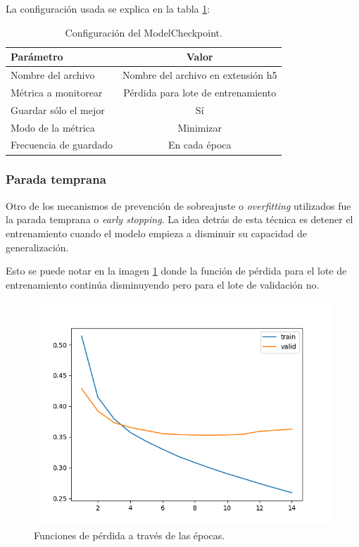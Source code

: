 La configuración usada se explica en la tabla \ref{tab:checkpoint}:
\begin{table}[H]
	\centering
	\caption[Configuración ModelCheckpoint]{Configuración del ModelCheckpoint.}
	\begin{tabular}{l c}    
		\toprule
		\textbf{Parámetro}			& 			\textbf{Valor}  \\
		\midrule	
		Nombre del archivo			& 			Nombre del archivo en extensión h5  \\
		Métrica a monitorear 		& 			Pérdida para lote de entrenamiento  \\
		Guardar sólo el mejor		&			Sí \\
		Modo de la métrica 			& 			Minimizar \\
		Frecuencia de guardado 		& 			En cada época  \\
		\bottomrule
		\hline
	\end{tabular}
	\label{tab:checkpoint}
\end{table}

\subsubsection{Parada temprana}

Otro de los mecanismos de prevención de sobreajuste o \textit{overfitting} utilizados fue la parada temprana o \textit{early stopping}. La idea detrás de esta técnica es detener el entrenamiento cuando el modelo empieza a disminuir su capacidad de generalización.

Esto se puede notar en la imagen \ref{fig:cap3-overfitting} donde la función de pérdida para el lote de entrenamiento continúa disminuyendo pero para el lote de validación no.

\begin{figure}[htbp]
	\centering
	\includegraphics[width=.8\textwidth]{./Figures/cap3-overfitting.png}
	\caption{Funciones de pérdida a través de las épocas.}
	\label{fig:cap3-overfitting}
\end{figure}

